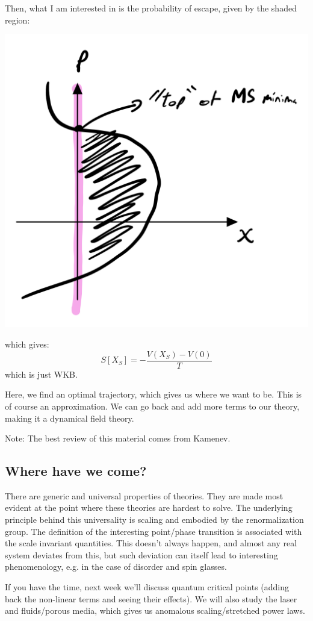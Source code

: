 Then, what I am interested in is the probability of escape, given by the shaded region:

\begin{center}
    \includegraphics[scale=0.3]{Lectures/Figures/lec16-metastablephase.png}
\end{center}

which gives:
\begin{equation}
    S[X_S] = -\frac{V(X_S) - V(0)}{T}
\end{equation}
which is just WKB.

Here, we find an optimal trajectory, which gives us where we want to be. This is of course an approximation. We can go back and add more terms to our theory, making it a dynamical field theory. 

Note: The best review of this material comes from Kamenev.

\subsection{Where have we come?}
There are generic and universal properties of theories. They are made most evident at the point where these theories are hardest to solve. The underlying principle behind this universality is scaling and embodied by the renormalization group. The definition of the interesting point/phase transition is associated with the scale invariant quantities. This doesn't always happen, and almost any real system deviates from this, but such deviation can itself lead to interesting phenomenology, e.g. in the case of disorder and spin glasses.

If you have the time, next week we'll discuss quantum critical points (adding back the non-linear terms and seeing their effects). We will also study the laser and fluids/porous media, which gives us anomalous scaling/stretched power laws. 